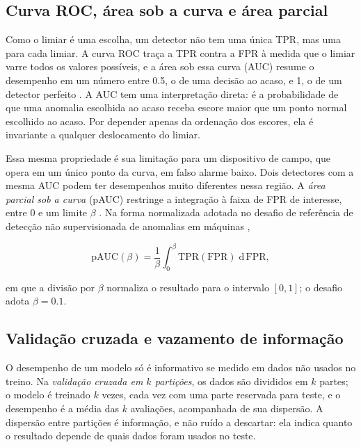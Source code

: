 \subsection{Curva ROC, área sob a curva e área parcial}

Como o limiar é uma escolha, um detector não tem uma única TPR, mas uma para cada limiar. A
curva ROC traça a TPR contra a FPR à medida que o limiar varre todos os valores possíveis,
e a área sob essa curva (AUC) resume o desempenho em um número entre \num{0,5}, o de uma
decisão ao acaso, e 1, o de um detector perfeito \cite{fawcett2006}. A AUC tem uma
interpretação direta: é a probabilidade de que uma anomalia escolhida ao acaso receba escore
maior que um ponto normal escolhido ao acaso. Por depender apenas da ordenação dos escores,
ela é invariante a qualquer deslocamento do limiar.

Essa mesma propriedade é sua limitação para um dispositivo de campo, que opera em um único
ponto da curva, em falso alarme baixo. Dois detectores com a mesma AUC podem ter
desempenhos muito diferentes nessa região. A \emph{área parcial sob a curva} (pAUC)
restringe a integração à faixa de FPR de interesse, entre 0 e um limite $\beta$
\cite{mcclish1989}. Na forma normalizada adotada no desafio de referência de detecção não
supervisionada de anomalias em máquinas \cite{koizumi2020},

\begin{equation}
\mathrm{pAUC}(\beta) = \frac{1}{\beta}\int_{0}^{\beta} \mathrm{TPR}(\mathrm{FPR})\; \mathrm{d}\,\mathrm{FPR},
\label{eq:fund-pauc}
\end{equation}

\noindent
em que a divisão por $\beta$ normaliza o resultado para o intervalo $[0, 1]$; o desafio
adota $\beta = \num{0,1}$.

\subsection{Validação cruzada e vazamento de informação}
\label{sec:fund-validacao}

O desempenho de um modelo só é informativo se medido em dados não usados no treino. Na
\emph{validação cruzada em $k$ partições}, os dados são divididos em $k$ partes; o modelo é
treinado $k$ vezes, cada vez com uma parte reservada para teste, e o desempenho é a média
das $k$ avaliações, acompanhada de sua dispersão. A dispersão entre partições é informação,
e não ruído a descartar: ela indica quanto o resultado depende de quais dados foram usados
no teste.

